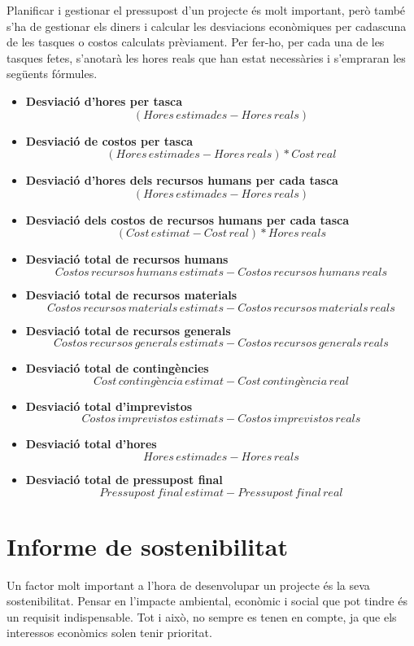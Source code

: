 \documentclass[a4paper]{article}
\begin{document}
Planificar i gestionar el pressupost d'un projecte és molt important, però també s'ha de gestionar els diners i calcular les desviacions econòmiques per cadascuna de les tasques o costos calculats prèviament. Per fer-ho, per cada una de les tasques fetes, s'anotarà les hores reals que han estat necessàries i s'empraran les següents fórmules.
\begin{itemize}
    \item \textbf{Desviació d'hores per tasca}
    \[(Hores\,estimades - Hores\,reals)\]
    \item \textbf{Desviació de costos per tasca}
    \[(Hores\,estimades - Hores\,reals) * Cost\,real\]
    \item \textbf{Desviació d'hores dels recursos humans per cada tasca}
    \[(Hores\,estimades - Hores\,reals)\]
    \item \textbf{Desviació dels costos de recursos humans per cada tasca}
    \[(Cost\, estimat - Cost\,real) * Hores\,reals\]
    \item \textbf{Desviació total de recursos humans}
    \[Costos\,recursos\,humans\,estimats - Costos\,recursos\,humans\,reals\]
    \item \textbf{Desviació total de recursos materials}
    \[Costos\,recursos\,materials\,estimats - Costos\,recursos\,materials\,reals\]
    \item \textbf{Desviació total de recursos generals}
    \[Costos\,recursos\,generals\,estimats - Costos\,recursos\,generals\,reals\]
    \item \textbf{Desviació total de contingències}
    \[Cost\,contingència\,estimat - Cost\,contingència\,real\]
    \item \textbf{Desviació total d'imprevistos}
    \[Costos\,imprevistos\,estimats - Costos\,imprevistos\,reals\]
    \item \textbf{Desviació total d'hores}
    \[Hores\,estimades - Hores\,reals\]
    \item \textbf{Desviació total de pressupost final}
    \[Pressupost\,final\,estimat - Pressupost\,final\,real\]
\end{itemize}

\newpage
\section{Informe de sostenibilitat}
Un factor molt important a l'hora de desenvolupar un projecte és la seva sostenibilitat. Pensar en l'impacte ambiental, econòmic i social que pot tindre és un requisit indispensable. Tot i això, no sempre es tenen en compte, ja que els interessos econòmics solen tenir prioritat. 
\end{document}
